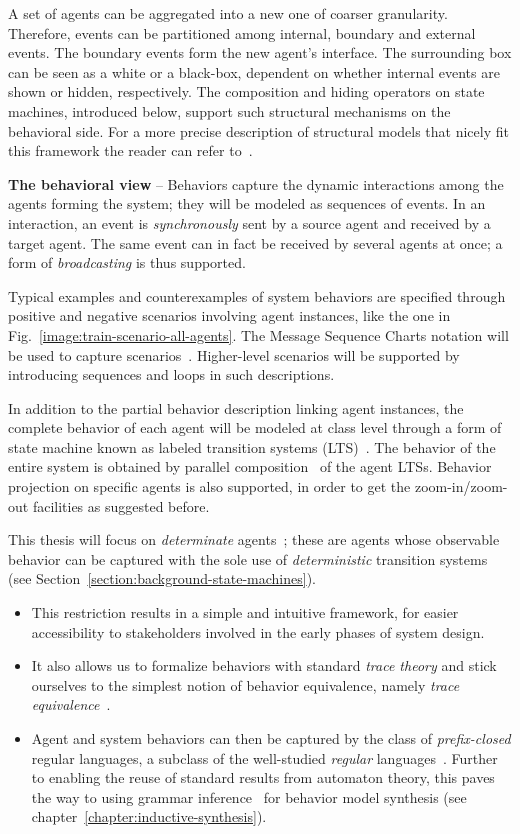A set of agents can be aggregated into a new one of coarser granularity. Therefore, events can be partitioned among internal, boundary and external events. The boundary events form the new agent's interface. The surrounding box can be seen as a white or a black-box, dependent on whether internal events are shown or hidden, respectively. The composition and hiding operators on state machines, introduced below, support such structural mechanisms on the behavioral side. For a more precise description of structural models that nicely fit this framework the reader can refer to~\cite{Magee:1995}.

\noindent \textbf{The behavioral view} -- Behaviors capture the dynamic interactions among the agents forming the system; they will be modeled as sequences of events. In an interaction, an event is \emph{synchronously} sent by a source agent and received by a target agent. The same event can in fact be received by several agents at once; a form of \emph{broadcasting} is thus supported. 

Typical examples and counterexamples of system behaviors are specified through positive and negative scenarios involving agent instances, like the one in Fig.~\ref{image:train-scenario-all-agents}. The Message Sequence Charts notation will be used to capture scenarios~\cite{ITU:1996}. Higher-level scenarios will be supported by introducing sequences and loops in such descriptions.

In addition to the partial behavior description linking agent instances, the complete behavior of each agent will be modeled at class level through a form of state machine known as labeled transition systems (LTS)~\cite{Keller:1976, Milner:1989}. The behavior of the entire system is obtained by parallel composition~\cite{Hoare:1985} of the agent LTSs. Behavior  projection on specific agents is also supported, in order to get the zoom-in/zoom-out facilities as suggested before.

This thesis will focus on \emph{determinate} agents~\cite{Engelfriet:1985}; these are agents whose observable behavior can be captured with the sole use of \emph{deterministic} transition systems (see Section~\ref{section:background-state-machines}).
\begin{itemize} 
\item This restriction results in a simple and intuitive framework, for easier accessibility to stakeholders involved in the early phases of system design. 
\item It also allows us to formalize behaviors with standard \emph{trace theory} \cite{Hoare:1985} and stick ourselves to the simplest notion of behavior equivalence, namely \emph{trace equivalence}~\cite{Engelfriet:1985}. 
\item Agent and system behaviors can then be captured by the class of \emph{prefix-closed} regular languages, a subclass of the well-studied \emph{regular} languages~\cite{Hopcroft:1979, Aho:1986}. Further to enabling the reuse of standard results from automaton theory, this paves the way to using grammar inference~\cite{Gold:1978} for behavior model synthesis (see chapter~\ref{chapter:inductive-synthesis}). 
\end{itemize}

